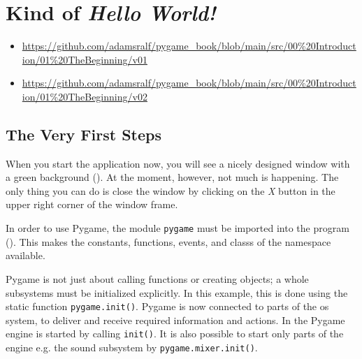 \newpage
\section{Kind of \emph{Hello World!}}
\begin{diskbox}
	\begin{itemize}
		\item  \url{https://github.com/adamsralf/pygame_book/blob/main/src/00%20Introduction/01%20TheBeginning/v01}
		\item  \url{https://github.com/adamsralf/pygame_book/blob/main/src/00%20Introduction/01%20TheBeginning/v02}
	\end{itemize}
\end{diskbox}

\subsection{The Very First Steps}

\begin{figure}
	\vspace{-2.0em}
\end{figure}%
When you start the application now, you will see a nicely designed window with a green background (). At the moment, however, not much is happening. The only thing you can do is close the window by clicking on the \emph{X} button in the upper right corner of the window frame.

In order to use Pygame, the module \texttt{pygame} must be imported into the program (). This makes the \glspl{constant}, \glspl{function}, \glspl{event}, and \glspl{class} of the \gls{namespace} available.


Pygame is not just about calling functions or creating objects; a whole subsystems must be initialized explicitly. In this example, this is done using the static function
\texttt{pygame.init()}. Pygame is now connected to parts of the \Gls{os} system, to deliver and receive required information and actions. In  the Pygame engine is started by calling \texttt{init()}. It is also possible to start only parts of the engine e.g. the sound subsystem by \texttt{pygame.mixer.init()}.

